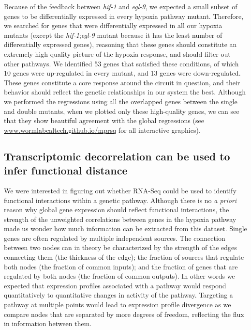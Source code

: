 \documentclass[9pt,twocolumn,twoside]{pnas-new}
\newcommand{\egl}{\emph{egl-9}}
\newcommand{\hif}{\emph{hif-1}}
\newcommand{\inall}{53}
\newcommand{\allup}{10}
\newcommand{\alldown}{13}
\begin{document}
Because of the feedback between \hif{} and \egl{}, we expected a small subset of
genes to be differentially expressed in every hypoxia pathway mutant.
Therefore, we searched for genes that were differentially expressed in all our
hypoxia mutants (except the \hif{};\egl{} mutant because it has the least number
of differentially expressed genes), reasoning that these genes should constitute
an extremely high-quality picture of the hypoxia response, and should filter out other
pathways.
We identified \inall{} genes that satisfied these conditions, of which \allup{}
genes were up-regulated in every mutant, and \alldown{} genes were down-regulated.
These genes constitute a core response around the
circuit in question, and their behavior should reflect the genetic relationships
in our system the best. Although we performed the regressions using all the
overlapped genes between the single and double mutants, when we plotted only
these high-quality genes, we can see that they show beautiful agreement with the
global regressions (see \url{www.wormlabcaltech.github.io/mprsq} for all
interactive graphics).

\subsection*{Transcriptomic decorrelation can be used to infer functional distance}
\label{sub:decorrelation}

We were interested in figuring out whether RNA-Seq could be used to identify
functional interactions within a genetic pathway. Although there is no \emph{a
priori} reason why global gene expression should reflect functional interactions,
the strength of the unweighted correlations between genes in the hypoxia pathway
made us wonder how much information can be extracted from this dataset. Single
genes are often regulated by multiple independent sources. The connection between
two nodes can in theory be characterized by the strength of the edges connecting
them (the thickness of the edge); the fraction of sources that regulate both
nodes (the fraction of common inputs); and the fraction of genes that are
regulated by both nodes (the fraction of common outputs).
In other words we expected that expression profiles associated with a pathway
would respond quantitatively to quantitative changes in activity of the pathway.
Targeting a pathway at multiple points would lead to expression profile
divergence as we compare nodes that are separated by more degrees of freedom,
reflecting the flux in information between them.
\end{document}
